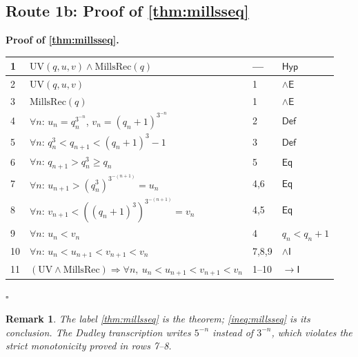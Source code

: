\documentclass[11pt,reqno]{amsart}
\theoremstyle{blueplain}
\newtheorem{remark}{Remark}[section]
\renewcommand{\qedsymbol}{\textcolor{proofqed}{\ensuremath{\square}}}
\renewenvironment{proof}[1][Proof]{\par\noindent\textbf{\textcolor{proofhead}{#1.}}\par\nobreak}{\par\nobreak\hfill\qedsymbol}
\numberwithin{equation}{section}
\begin{document}
\subsection{Route 1b: Proof of \cref{thm:millsseq}}

\begin{proof}[\textbf{Proof of \cref{thm:millsseq}}]
	\label{proof:millsseq}
	{\scriptsize
		\begin{tabular}{|m{0.7cm}|m{12cm}|m{1.4cm}|m{2.5cm}|}
			\hline
			1 & $\mathrm{UV}(q,u,v)\wedge\mathrm{MillsRec}(q)$ & --- & $\mathsf{Hyp}$ \\ \hline
			2 & $\mathrm{UV}(q,u,v)$ & 1 & $\wedge\mathsf{E}$ \\ \hline
			3 & $\mathrm{MillsRec}(q)$ & 1 & $\wedge\mathsf{E}$ \\ \hline
			4 & $\forall n$: $u_n=q_n^{3^{-n}}$, $v_n=(q_n+1)^{3^{-n}}$ & 2 & $\mathsf{Def}$ \\ \hline
			5 & $\forall n$: $q_n^{3}<q_{n+1}<(q_n+1)^{3}-1$ & 3 & $\mathsf{Def}$ \\ \hline
			6 & $\forall n$: $q_{n+1}>q_n^{3}\ge q_n$ & 5 & $\mathsf{Eq}$ \\ \hline
			7 & $\forall n$: $u_{n+1}>(q_n^{3})^{3^{-(n+1)}}=u_n$ & 4,6 & $\mathsf{Eq}$ \\ \hline
			8 & $\forall n$: $v_{n+1}<((q_n+1)^{3})^{3^{-(n+1)}}=v_n$ & 4,5 & $\mathsf{Eq}$ \\ \hline
			9 & $\forall n$: $u_n<v_n$ & 4 & $q_n<q_n+1$ \\ \hline
			10 & $\forall n$: $u_n<u_{n+1}<v_{n+1}<v_n$ & 7,8,9 & $\wedge\mathsf{I}$ \\ \hline
			11 & $(\mathrm{UV}\wedge\mathrm{MillsRec})\Rightarrow\forall n,\ u_n<u_{n+1}<v_{n+1}<v_n$ & 1--10 & $\rightarrow\mathsf{I}$ \\ \hline
		\end{tabular}
	}
\end{proof}

\begin{remark}
	{\scriptsize The label \cref{thm:millsseq} is the theorem; \cref{ineq:millsseq} is its conclusion.  The Dudley transcription writes $5^{-n}$ instead of $3^{-n}$, which violates the strict monotonicity proved in rows 7–8. }
\end{remark}

\end{document}
